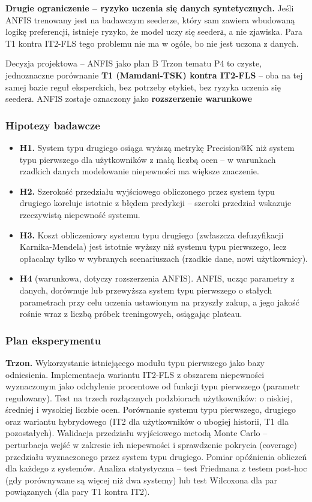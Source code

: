 \documentclass[12pt,a4paper]{article}
\newcommand{\topicsection}[1]{\subsubsection*{#1}}
\begin{document}
\textbf{Drugie ograniczenie -- ryzyko uczenia się danych syntetycznych.} Jeśli ANFIS trenowany jest na badawczym seederze, który sam zawiera wbudowaną logikę preferencji, istnieje ryzyko, że model uczy się seederа, a nie zjawiska. Para T1 kontra IT2-FLS tego problemu nie ma w ogóle, bo nie jest uczona z danych.

\begin{infobox}{Decyzja projektowa -- ANFIS jako plan B}
Trzon tematu P4 to czyste, jednoznaczne porównanie \textbf{T1 (Mamdani-TSK) kontra IT2-FLS} -- oba na tej samej bazie reguł eksperckich, bez potrzeby etykiet, bez ryzyka uczenia się seederа. ANFIS zostaje oznaczony jako \textbf{rozszerzenie warunkowe}
\end{infobox}

\topicsection{Hipotezy badawcze}
\begin{itemize}
\item \textbf{H1.} System typu drugiego osiąga wyższą metrykę Precision@K niż system typu pierwszego dla użytkowników z małą liczbą ocen -- w warunkach rzadkich danych modelowanie niepewności ma większe znaczenie.
\item \textbf{H2.} Szerokość przedziału wyjściowego obliczonego przez system typu drugiego koreluje istotnie z błędem predykcji -- szeroki przedział wskazuje rzeczywistą niepewność systemu.
\item \textbf{H3.} Koszt obliczeniowy systemu typu drugiego (zwłaszcza defuzyfikacji Karnika-Mendela) jest istotnie wyższy niż systemu typu pierwszego, lecz opłacalny tylko w wybranych scenariuszach (rzadkie dane, nowi użytkownicy).
\item \textbf{H4} (warunkowa, dotyczy rozszerzenia ANFIS). ANFIS, ucząc parametry z danych, dorównuje lub przewyższa system typu pierwszego o stałych parametrach przy celu uczenia ustawionym na przyszły zakup, a jego jakość rośnie wraz z liczbą próbek treningowych, osiągając plateau.
\end{itemize}

\topicsection{Plan eksperymentu}
\textbf{Trzon.} Wykorzystanie istniejącego modułu typu pierwszego jako bazy odniesienia. Implementacja wariantu IT2-FLS z obszarem niepewności wyznaczonym jako odchylenie procentowe od funkcji typu pierwszego (parametr regulowany). Test na trzech rozłącznych podzbiorach użytkowników: o niskiej, średniej i wysokiej liczbie ocen. Porównanie systemu typu pierwszego, drugiego oraz wariantu hybrydowego (IT2 dla użytkowników o ubogiej historii, T1 dla pozostałych). Walidacja przedziału wyjściowego metodą Monte Carlo -- perturbacja wejść w zakresie ich niepewności i sprawdzenie pokrycia (coverage) przedziału wyznaczonego przez system typu drugiego. Pomiar opóźnienia obliczeń dla każdego z systemów. Analiza statystyczna -- test Friedmana z testem post-hoc (gdy porównywane są więcej niż dwa systemy) lub test Wilcoxona dla par powiązanych (dla pary T1 kontra IT2).
\end{document}
